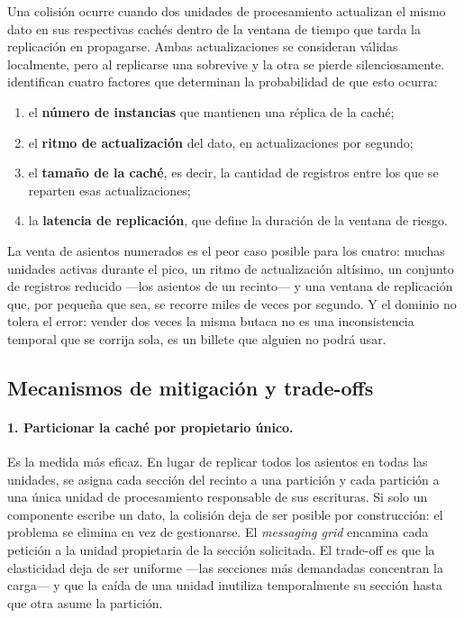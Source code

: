 Una colisión ocurre cuando dos unidades de procesamiento actualizan el mismo dato en sus respectivas cachés dentro de la ventana de tiempo que tarda la replicación en propagarse. Ambas actualizaciones se consideran válidas localmente, pero al replicarse una sobrevive y la otra se pierde silenciosamente. \textcite{richardsford2020} identifican cuatro factores que determinan la probabilidad de que esto ocurra:

\begin{enumerate}[leftmargin=1.8em]
  \item el \textbf{número de instancias} que mantienen una réplica de la caché;
  \item el \textbf{ritmo de actualización} del dato, en actualizaciones por segundo;
  \item el \textbf{tamaño de la caché}, es decir, la cantidad de registros entre los que se reparten esas actualizaciones;
  \item la \textbf{latencia de replicación}, que define la duración de la ventana de riesgo.
\end{enumerate}

La venta de asientos numerados es el peor caso posible para los cuatro: muchas unidades activas durante el pico, un ritmo de actualización altísimo, un conjunto de registros reducido ---los asientos de un recinto--- y una ventana de replicación que, por pequeña que sea, se recorre miles de veces por segundo. Y el dominio no tolera el error: vender dos veces la misma butaca no es una inconsistencia temporal que se corrija sola, es un billete que alguien no podrá usar.

\subsection{Mecanismos de mitigación y trade-offs}

\paragraph{1. Particionar la caché por propietario único.} Es la medida más eficaz. En lugar de replicar todos los asientos en todas las unidades, se asigna cada sección del recinto a una partición y cada partición a una única unidad de procesamiento responsable de sus escrituras. Si solo un componente escribe un dato, la colisión deja de ser posible por construcción: el problema se elimina en vez de gestionarse. El \emph{messaging grid} encamina cada petición a la unidad propietaria de la sección solicitada. El trade-off es que la elasticidad deja de ser uniforme ---las secciones más demandadas concentran la carga--- y que la caída de una unidad inutiliza temporalmente su sección hasta que otra asume la partición.

